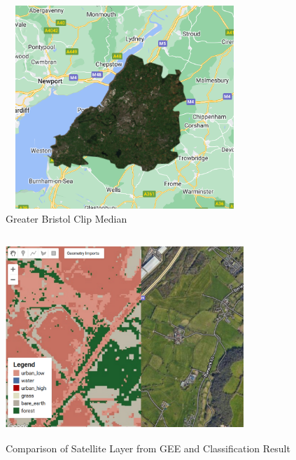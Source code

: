 \documentclass[
  letterpaper,
  DIV=11,
  numbers=noendperiod]{scrreprt}
\begin{document}

\begin{figure}

{\centering \includegraphics[width=3.54167in,height=3.02083in]{images/wk7/bristol_clip.png}

}

\caption{Greater Bristol Clip Median}

\end{figure}

\begin{figure}

{\centering \includegraphics[width=3.54167in,height=3.02083in]{images/wk7/comparison.png}

}

\caption{Comparison of Satellite Layer from GEE and Classification
Result}

\end{figure}
\end{document}

